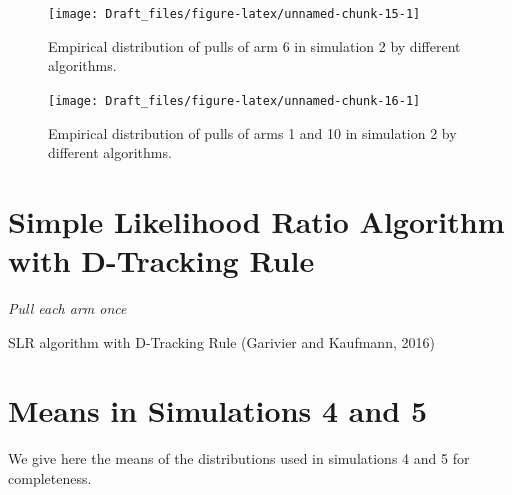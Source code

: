 \documentclass[11pt,]{article}
\begin{document}
\begin{figure}

{\centering \texttt{[image: Draft\_files/figure-latex/unnamed-chunk-15-1]} 

}

\caption{Empirical distribution of pulls of arm 6 in simulation 2 by different algorithms.}\label{fig:unnamed-chunk-15}
\end{figure}

\begin{figure}

{\centering \texttt{[image: Draft\_files/figure-latex/unnamed-chunk-16-1]} 

}

\caption{Empirical distribution of pulls of arms 1 and 10 in simulation 2 by different algorithms.}\label{fig:unnamed-chunk-16}
\end{figure}

\newpage

\section{Simple Likelihood Ratio Algorithm with D-Tracking Rule} \label{app:SLRD}

\IncMargin{1em}

\begin{algorithm}
\BlankLine
\emph{Pull each arm once}\;
\caption{SLR algorithm with D-Tracking Rule (Garivier and Kaufmann, 2016)} \label{algo_slr_1d_dTracking}
\end{algorithm}

\DecMargin{1em}

\newpage

\section{Means in Simulations 4 and 5} \label{app:MeansSim45}

We give here the means of the distributions used in simulations 4 and 5
for completeness.
\end{document}
